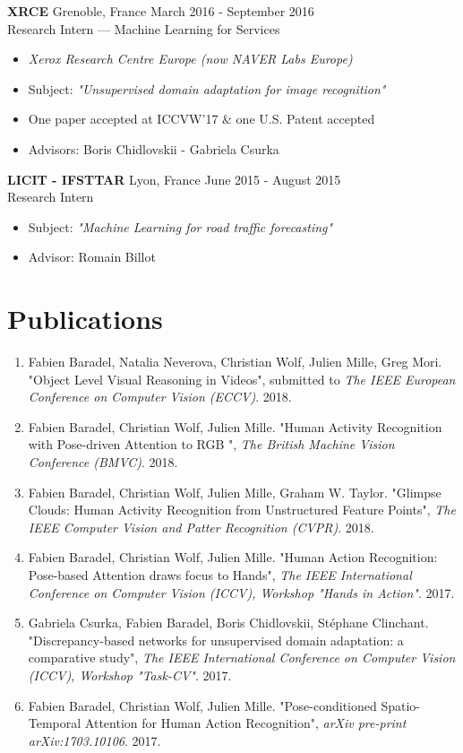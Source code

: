 \documentclass[10pt]{res} %
\begin{document}
\begin{resume}
\textbf{XRCE} \hfill Grenoble, France \hfill March 2016 - September 2016 \\
Research Intern --- Machine Learning for Services
\begin{itemize}
\item \textit{Xerox Research Centre Europe (now NAVER Labs Europe)}
\item Subject: \textit{"Unsupervised domain adaptation for image recognition"}
\item One paper accepted at ICCVW'17 \& one U.S. Patent accepted
\item Advisors: Boris Chidlovskii - Gabriela Csurka
\end{itemize}

\textbf{LICIT - IFSTTAR} \hfill Lyon, France \hfill June 2015 - August 2015 \\
Research Intern
\begin{itemize}
\item Subject: \textit{"Machine Learning for road traffic forecasting"}
\item Advisor: Romain Billot
\end{itemize}



\section{\large Publications} 
\begin{enumerate}[wide=0pt]
	\item Fabien Baradel, Natalia Neverova, Christian Wolf, Julien Mille, Greg Mori. "Object Level Visual Reasoning in Videos", submitted to \textit{The IEEE European Conference on Computer Vision (ECCV)}. 2018.
	\item Fabien Baradel, Christian Wolf, Julien Mille. "Human Activity Recognition with Pose-driven Attention to RGB ", \textit{The British Machine Vision Conference (BMVC)}. 2018.
	\item Fabien Baradel, Christian Wolf, Julien Mille, Graham W. Taylor. "Glimpse Clouds: Human Activity Recognition from Unstructured Feature Points", \textit{The IEEE Computer Vision and Patter Recognition (CVPR)}. 2018.
	\item Fabien Baradel, Christian Wolf, Julien Mille. "Human Action Recognition: Pose-based Attention draws focus to Hands", \textit{The IEEE International Conference on Computer Vision (ICCV), Workshop "Hands in Action"}. 2017.
	\item Gabriela Csurka, Fabien Baradel, Boris Chidlovskii, Stéphane Clinchant. "Discrepancy-based networks for unsupervised domain adaptation: a comparative study",  \textit{The IEEE International Conference on Computer Vision (ICCV), Workshop "Task-CV"}. 2017.
	\item Fabien Baradel, Christian Wolf, Julien Mille. "Pose-conditioned Spatio-Temporal Attention for Human Action Recognition",  \textit{arXiv pre-print arXiv:1703.10106}. 2017.
\end{enumerate}


\end{resume}
\end{document}
